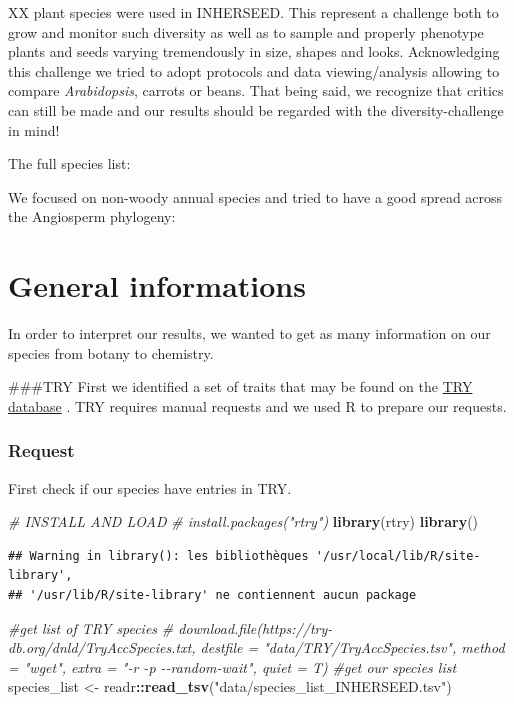 \documentclass[
  12pt,
  american,
  a4paper,
  extrafontsizes,onecolumn,openright
  ]{memoir}
\newenvironment{Shaded}{\begin{snugshade}}{\end{snugshade}}
\newcommand{\CommentTok}[1]{\textcolor[rgb]{0.56,0.35,0.01}{\textit{#1}}}
\newcommand{\FunctionTok}[1]{\textcolor[rgb]{0.13,0.29,0.53}{\textbf{#1}}}
\newcommand{\NormalTok}[1]{#1}
\newcommand{\OtherTok}[1]{\textcolor[rgb]{0.56,0.35,0.01}{#1}}
\newcommand{\SpecialCharTok}[1]{\textcolor[rgb]{0.81,0.36,0.00}{\textbf{#1}}}
\newcommand{\StringTok}[1]{\textcolor[rgb]{0.31,0.60,0.02}{#1}}
\begin{document}
XX plant species were used in INHERSEED.
This represent a challenge both to grow and monitor such diversity as well as to sample and properly phenotype plants and seeds varying tremendously in size, shapes and looks.
Acknowledging this challenge we tried to adopt protocols and data viewing/analysis allowing to compare \emph{Arabidopsis}, carrots or beans.
That being said, we recognize that critics can still be made and our results should be regarded with the diversity-challenge in mind!

The full species list:

We focused on non-woody annual species and tried to have a good spread across the Angiosperm phylogeny:

\section{General informations}\label{general-informations}

In order to interpret our results, we wanted to get as many information on our species from botany to chemistry.

\#\#\#TRY
First we identified a set of traits that may be found on the \href{https://www.try-db.org/}{TRY database} \autocite{kattge2019}.
TRY requires manual requests and we used R to prepare our requests.

\subsubsection{Request}\label{request}

First check if our species have entries in TRY.

\begin{Shaded}
\begin{Highlighting}[]
\CommentTok{\# INSTALL AND LOAD}
\CommentTok{\# install.packages("rtry")}
\FunctionTok{library}\NormalTok{(rtry)}
\FunctionTok{library}\NormalTok{()}
\end{Highlighting}
\end{Shaded}

\begin{verbatim}
## Warning in library(): les bibliothèques '/usr/local/lib/R/site-library',
## '/usr/lib/R/site-library' ne contiennent aucun package
\end{verbatim}

\begin{Shaded}
\begin{Highlighting}[]
\CommentTok{\#get list of TRY species}
\CommentTok{\# download.file(\textquotesingle{}https://try{-}db.org/dnld/TryAccSpecies.txt\textquotesingle{}, destfile = "data/TRY/TryAccSpecies.tsv", method = "wget", extra = "{-}r {-}p {-}{-}random{-}wait", quiet = T)}
\CommentTok{\#get our species list}
\NormalTok{species\_list }\OtherTok{\textless{}{-}}\NormalTok{ readr}\SpecialCharTok{::}\FunctionTok{read\_tsv}\NormalTok{(}\StringTok{"data/species\_list\_INHERSEED.tsv"}\NormalTok{)}
\end{Highlighting}
\end{Shaded}
\end{document}

